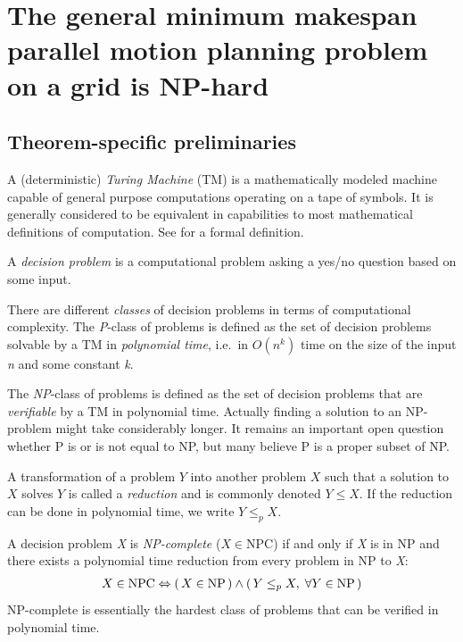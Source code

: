 \section{The general minimum makespan parallel motion planning problem on a grid is NP-hard}\label{chapter:main_proof}

\subsection{Theorem-specific preliminaries}

A (deterministic) \emph{Turing Machine} (TM) is a mathematically modeled machine capable of general purpose computations operating on a tape of symbols. 
It is generally considered to be equivalent in capabilities to most mathematical definitions of computation. 
See \cite{aw/HopcroftU79} for a formal definition.

A \emph{decision problem} is a computational problem asking a yes/no question based on some input.

There are different \emph{classes} of decision problems in terms of computational complexity. 
The \emph{P}-class of problems is defined as the set of decision problems solvable by a TM in \emph{polynomial time}, i.e.~in \(O(n^k)\) time on the size of the input \emph{n} and some constant \emph{k}.

The \emph{NP}-class of problems is defined as the set of decision problems that are \emph{verifiable} by a TM in polynomial time. 
Actually finding a solution to an NP-problem might take considerably longer. 
It remains an important open question whether P is or is not equal to NP, but many believe P is a proper subset of NP.

A transformation of a problem \(Y\) into another problem \(X\) such that a solution to \(X\) solves \(Y\) is called a \emph{reduction} and is commonly denoted \(Y \leq X\). 
If the reduction can be done in polynomial time, we write \(Y \leq_p X\).

\begin{definition}\label{def:np_complete}
	A decision problem \emph{X} is \emph{NP-complete} (\(X \in \text{NPC}\)) if and only if \emph{X} is in NP and there exists a polynomial time reduction from every problem in NP to \emph{X}:
	\begin{align*}
		X \in \text{NPC} \Leftrightarrow (\, X \in \text{NP} \,) \land (\, Y \leq_p X, \; \forall Y \in \text{NP} \,)
	\end{align*}
	NP-complete is essentially the hardest class of problems that can be verified in polynomial time. 
\end{definition}


